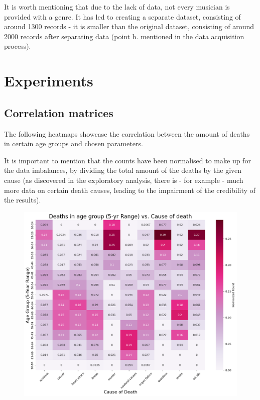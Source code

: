 \documentclass{article}
\begin{document}
It is worth mentioning that due to the lack of data, not every musician is provided with a genre. It has led to creating a separate dataset, consisting of around 1300 records - it is smaller than the original dataset, consisting of around 2000 records after separating data (point h. mentioned in the data acquisition process).



\clearpage
\section{Experiments}


\subsection{Correlation matrices}

The following heatmaps showcase the correlation between the amount of deaths in certain age groups and chosen parameters.

It is important to mention that the counts have been normalised to make up for the data imbalances, by dividing the total amount of the deaths by the given cause (as discovered in the exploratory analysis, there is - for example - much more data on certain death causes, leading to the impairment of the credibility of the results).

\begin{figure} [H]
    \centering
    \includegraphics[width=1\linewidth]{graph_images/heatmaps/age vs death cause.png}
    \label{fig:enter-label}
\end{figure}
\end{document}
